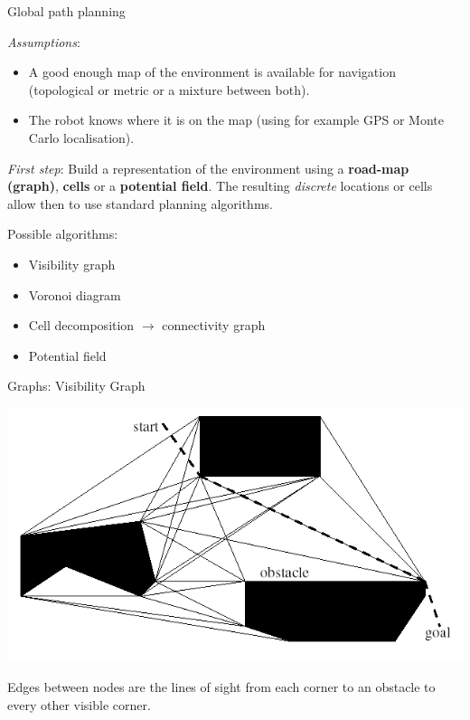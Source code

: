 \documentclass[compress,xcolor=table]{beamer}
\begin{document}
\begin{frame}{Global path planning}

\emph{Assumptions}:

\begin{itemize}
\item A good enough map of the environment is available for navigation
  (topological or metric or a mixture between both).
\item The robot knows where it is on the map (using for example GPS or Monte
  Carlo localisation).
\end{itemize}

\pause

\emph{First step}: Build a representation of the environment using a \textbf{road-map (graph)},
        \textbf{cells} or a \textbf{potential field}. The resulting
        \emph{discrete} locations or cells allow then to use standard planning algorithms.

Possible algorithms:

\begin{itemize}
\item Visibility graph
\item Voronoi diagram
\item Cell decomposition $\rightarrow$ connectivity graph
\item Potential field
\end{itemize}

\end{frame}


\begin{frame}{Graphs: Visibility Graph}


    \begin{center}
        \includegraphics[width=\linewidth]{visibilitygraph}
    \end{center}

    Edges between nodes are the lines of sight from each corner to an
    obstacle to every other visible corner.

\end{frame}
\end{document}

